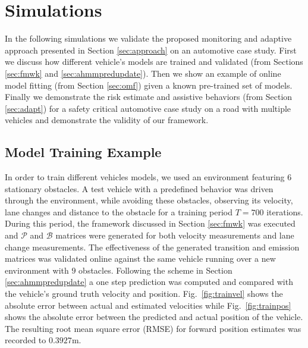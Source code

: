 \documentclass[letterpaper, 10 pt, conference]{ieeeconf}  %
\begin{document}
\section{Simulations} \label{sec:sims}
In the following simulations we validate the proposed monitoring and adaptive approach presented in Section \ref{sec:approach} on an automotive case study. First we discuss how different vehicle's models are trained and validated (from Sections \ref{sec:fmwk} and \ref{sec:ahmmpredupdate}). Then we show an example of online model fitting (from Section \ref{sec:omf}) given a known pre-trained set of models. Finally we demonstrate the risk estimate and assistive behaviors (from Section \ref{sec:adapt}) for a safety critical automotive case study on a road with multiple vehicles and demonstrate the validity of our framework.
\vspace{-5pt}
\subsection{Model Training Example}
In order to train different vehicles models, we used an environment featuring $6$ stationary obstacles. A test vehicle with a predefined behavior was driven through the environment, while avoiding these obstacles, observing its velocity, lane changes and distance to the obstacle for a training period $T=700$ iterations. During this period, the framework discussed in Section \ref{sec:fmwk} was executed and $\mathcal P$ and $\mathcal B$ matrices were generated for both velocity measurements and lane change measurements. The effectiveness of the generated transition and emission matrices was validated online against the same vehicle running over a new environment with $9$ obstacles. Following the scheme in Section \ref{sec:ahmmpredupdate} a one step prediction was computed and compared with the vehicle's ground truth velocity and position.
Fig.~\ref{fig:trainvel} shows the absolute error between actual and estimated velocities while Fig.~\ref{fig:trainpos} shows the absolute error between the predicted and actual position of the vehicle. The resulting root mean square error (RMSE) for forward position estimates was recorded to $0.3927$m.
\end{document}
